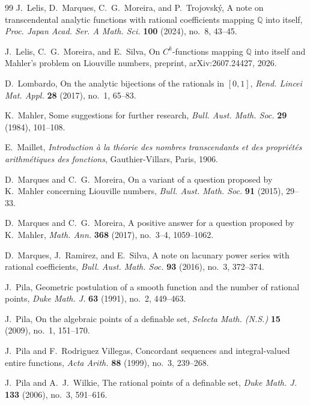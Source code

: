 \documentclass[11pt]{amsart}
\theoremstyle{remark}
\newcommand{\Q}{\mathbb{Q}}
\begin{document}
\begin{thebibliography}{99}
J.~Lelis, D.~Marques, C.~G.~Moreira, and P.~Trojovsk\'y,
A note on transcendental analytic functions with rational coefficients mapping $\Q$ into itself,
\textit{Proc. Japan Acad. Ser. A Math. Sci.} \textbf{100} (2024), no.~8, 43--45.

J.~Lelis, C.~G.~Moreira, and E.~Silva,
On $C^k$-functions mapping $\Q$ into itself and Mahler's problem on Liouville numbers,
preprint, arXiv:2607.24427, 2026.

D.~Lombardo,
On the analytic bijections of the rationals in $[0,1]$,
\textit{Rend. Lincei Mat. Appl.} \textbf{28} (2017), no.~1, 65--83.

K.~Mahler,
Some suggestions for further research,
\textit{Bull. Aust. Math. Soc.} \textbf{29} (1984), 101--108.

E.~Maillet,
\emph{Introduction \`a la th\'eorie des nombres transcendants et des propri\'et\'es arithm\'etiques des fonctions},
Gauthier-Villars, Paris, 1906.

D.~Marques and C.~G.~Moreira,
On a variant of a question proposed by K.~Mahler concerning Liouville numbers,
\textit{Bull. Aust. Math. Soc.} \textbf{91} (2015), 29--33.

D.~Marques and C.~G.~Moreira,
A positive answer for a question proposed by K.~Mahler,
\textit{Math. Ann.} \textbf{368} (2017), no.~3--4, 1059--1062.

D.~Marques, J.~Ramirez, and E.~Silva,
A note on lacunary power series with rational coefficients,
\textit{Bull. Aust. Math. Soc.} \textbf{93} (2016), no.~3, 372--374.

J.~Pila,
Geometric postulation of a smooth function and the number of rational points,
\textit{Duke Math. J.} \textbf{63} (1991), no.~2, 449--463.

J.~Pila,
On the algebraic points of a definable set,
\textit{Selecta Math. (N.S.)} \textbf{15} (2009), no.~1, 151--170.

J.~Pila and F.~Rodriguez Villegas,
Concordant sequences and integral-valued entire functions,
\textit{Acta Arith.} \textbf{88} (1999), no.~3, 239--268.

J.~Pila and A.~J.~Wilkie,
The rational points of a definable set,
\textit{Duke Math. J.} \textbf{133} (2006), no.~3, 591--616.


\end{thebibliography}
\end{document}
